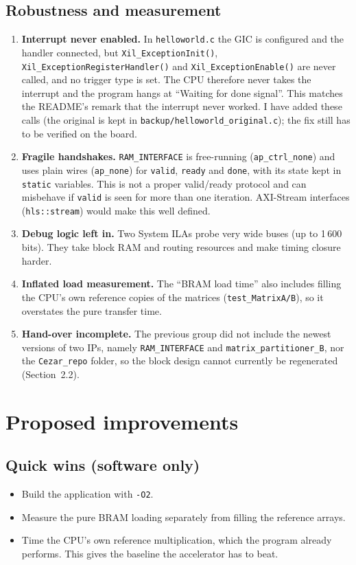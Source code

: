 \documentclass[11pt,a4paper]{article}
\newcommand{\code}[1]{\texttt{#1}}
\begin{document}
\subsection{Robustness and measurement}
\begin{enumerate}[label=\textbf{F\arabic*},resume]
  \item \textbf{Interrupt never enabled.} In \code{helloworld.c} the GIC is configured and the handler connected, but \code{Xil\_ExceptionInit()}, \code{Xil\_ExceptionRegisterHandler()} and \code{Xil\_ExceptionEnable()} are never called, and no trigger type is set. The CPU therefore never takes the interrupt and the program hangs at ``Waiting for done signal''. This matches the README's remark that the interrupt never worked. I have added these calls (the original is kept in \code{backup/helloworld\_original.c}); the fix still has to be verified on the board.
  \item \textbf{Fragile handshakes.} \code{RAM\_INTERFACE} is free-running (\code{ap\_ctrl\_none}) and uses plain wires (\code{ap\_none}) for \code{valid}, \code{ready} and \code{done}, with its state kept in \code{static} variables. This is not a proper valid/ready protocol and can misbehave if \code{valid} is seen for more than one iteration. AXI-Stream interfaces (\code{hls::stream}) would make this well defined.
  \item \textbf{Debug logic left in.} Two System ILAs probe very wide buses (up to 1\,600 bits). They take block RAM and routing resources and make timing closure harder.
  \item \textbf{Inflated load measurement.} The ``BRAM load time'' also includes filling the CPU's own reference copies of the matrices (\code{test\_MatrixA/B}), so it overstates the pure transfer time.
  \item \textbf{Hand-over incomplete.} The previous group did not include the newest versions of two IPs, namely \code{RAM\_INTERFACE} and \code{matrix\_partitioner\_B}, nor the \code{Cezar\_repo} folder, so the block design cannot currently be regenerated (Section~2.2).
\end{enumerate}

\section{Proposed improvements}

\subsection{Quick wins (software only)}
\begin{itemize}
  \item Build the application with \code{-O2}.
  \item Measure the pure BRAM loading separately from filling the reference arrays.
  \item Time the CPU's own reference multiplication, which the program already performs. This gives the baseline the accelerator has to beat.
\end{itemize}
\end{document}
